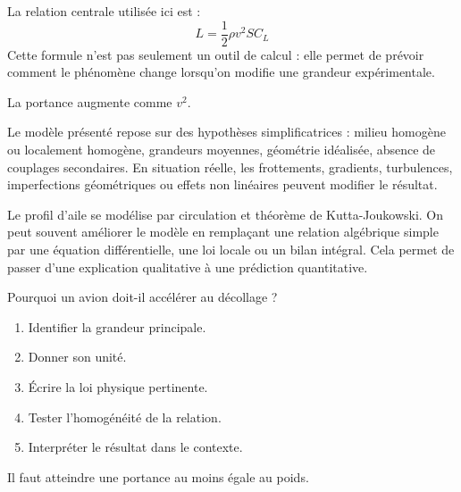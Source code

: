 \documentclass[11pt,a4paper]{article}
\begin{document}
\begin{theorembox}
La relation centrale utilisée ici est :
\[
L=\frac12\rho v^2SC_L
\]
Cette formule n'est pas seulement un outil de calcul : elle permet de prévoir comment le phénomène change lorsqu'on modifie une grandeur expérimentale.
\end{theorembox}

\begin{odgbox}
La portance augmente comme $v^2$.
\end{odgbox}

\begin{attentionbox}
Le modèle présenté repose sur des hypothèses simplificatrices : milieu homogène ou localement homogène, grandeurs moyennes, géométrie idéalisée, absence de couplages secondaires. En situation réelle, les frottements, gradients, turbulences, imperfections géométriques ou effets non linéaires peuvent modifier le résultat.
\end{attentionbox}

\begin{approfondissementbox}
Le profil d'aile se modélise par circulation et théorème de Kutta-Joukowski.
On peut souvent améliorer le modèle en remplaçant une relation algébrique simple par une équation différentielle, une loi locale ou un bilan intégral. Cela permet de passer d'une explication qualitative à une prédiction quantitative.
\end{approfondissementbox}

\begin{exercicebox}
Pourquoi un avion doit-il accélérer au décollage ?
\begin{enumerate}
  \item Identifier la grandeur principale.
  \item Donner son unité.
  \item Écrire la loi physique pertinente.
  \item Tester l'homogénéité de la relation.
  \item Interpréter le résultat dans le contexte.
\end{enumerate}
\end{exercicebox}

\begin{corrigebox}[Indication]
Il faut atteindre une portance au moins égale au poids.
\end{corrigebox}


\end{document}
